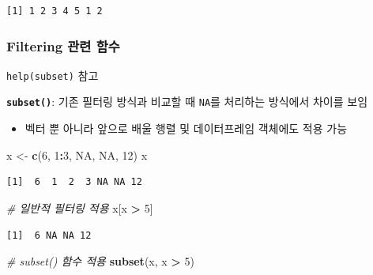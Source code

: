 \documentclass[
  11pt,
]{krantz}
\makeatletter
\newenvironment{Shaded}{\begin{snugshade}}{\end{snugshade}}
\newcommand{\CommentTok}[1]{\textcolor[rgb]{0.37,0.37,0.37}{\textit{#1}}}
\newcommand{\DecValTok}[1]{\textcolor[rgb]{0.06,0.06,0.06}{#1}}
\newcommand{\KeywordTok}[1]{\textcolor[rgb]{0.27,0.27,0.27}{\textbf{#1}}}
\newcommand{\NormalTok}[1]{#1}
\newcommand{\OperatorTok}[1]{\textcolor[rgb]{0.43,0.43,0.43}{\textbf{#1}}}
\newcommand{\OtherTok}[1]{\textcolor[rgb]{0.37,0.37,0.37}{#1}}
\newcommand{\StringTok}[1]{\textcolor[rgb]{0.5,0.5,0.5}{#1}}
\providecommand{\tightlist}{%
  \setlength{\itemsep}{0pt}\setlength{\parskip}{0pt}}
\newenvironment{kframe}{%
\medskip{}
\setlength{\fboxsep}{.8em}
 \def\at@end@of@kframe{}%
 \ifinner\ifhmode%
  \def\at@end@of@kframe{\end{minipage}}%
  \begin{minipage}{\columnwidth}%
 \fi\fi%
 \def\FrameCommand##1{\hskip\@totalleftmargin \hskip-\fboxsep
 \colorbox{shadecolor}{##1}\hskip-\fboxsep
     \hskip-\linewidth \hskip-\@totalleftmargin \hskip\columnwidth}%
 \MakeFramed {\advance\hsize-\width
   \@totalleftmargin\z@ \linewidth\hsize
   \@setminipage}}%
 {\par\unskip\endMakeFramed%
 \at@end@of@kframe}
\renewenvironment{quote}{\begin{kframe}}{\end{kframe}}
\makeatother
\begin{document}
\begin{verbatim}
[1] 1 2 3 4 5 1 2
\end{verbatim}

\normalsize

\hypertarget{fun-filtering}{%
\subsubsection*{\texorpdfstring{\textbf{Filtering 관련 함수}}{Filtering 관련 함수}}\label{fun-filtering}}


\begin{quote}
\texttt{help(subset)} 참고
\end{quote}

\textbf{\texttt{subset()}}: 기존 필터링 방식과 비교할 때 \texttt{NA}를 처리하는 방식에서 차이를 보임

\begin{itemize}
\tightlist
\item
  벡터 뿐 아니라 앞으로 배울 행렬 및 데이터프레임 객체에도 적용 가능
\end{itemize}

\footnotesize

\begin{Shaded}
\begin{Highlighting}[]
\NormalTok{x <-}\StringTok{ }\KeywordTok{c}\NormalTok{(}\DecValTok{6}\NormalTok{, }\DecValTok{1}\OperatorTok{:}\DecValTok{3}\NormalTok{, }\OtherTok{NA}\NormalTok{, }\OtherTok{NA}\NormalTok{, }\DecValTok{12}\NormalTok{)}
\NormalTok{x}
\end{Highlighting}
\end{Shaded}

\begin{verbatim}
[1]  6  1  2  3 NA NA 12
\end{verbatim}

\begin{Shaded}
\begin{Highlighting}[]
\CommentTok{# 일반적 필터링 적용 }
\NormalTok{x[x }\OperatorTok{>}\StringTok{ }\DecValTok{5}\NormalTok{]}
\end{Highlighting}
\end{Shaded}

\begin{verbatim}
[1]  6 NA NA 12
\end{verbatim}

\begin{Shaded}
\begin{Highlighting}[]
\CommentTok{# subset() 함수 적용}
\KeywordTok{subset}\NormalTok{(x, x }\OperatorTok{>}\StringTok{ }\DecValTok{5}\NormalTok{)}
\end{Highlighting}
\end{Shaded}
\end{document}
